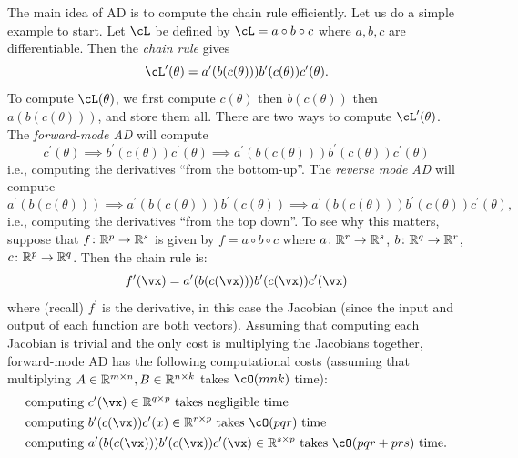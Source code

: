 \documentclass[../../book-main.tex]{subfiles}
\begin{document}
The main idea of AD is to compute the chain rule efficiently. Let us do a simple example to start. Let \(\cL\) be defined by \(\cL = a \circ b \circ c\) where \(a, b, c\) are differentiable. Then the \textit{chain rule} gives
\begin{equation}
    \cL^{\prime}(\theta) = a^{\prime}(b(c(\theta)))b^{\prime}(c(\theta))c^{\prime}(\theta).
\end{equation}
To compute \(\cL(\theta)\), we first compute \(c(\theta)\) then \(b(c(\theta))\) then \(a(b(c(\theta)))\), and store them all. There are two ways to compute \(\cL^{\prime}(\theta)\). The \textit{forward-mode AD} will compute 
\begin{equation}
    c^{\prime}(\theta) \implies b^{\prime}(c(\theta))c^{\prime}(\theta) \implies a^{\prime}(b(c(\theta)))b^{\prime}(c(\theta))c^{\prime}(\theta)
\end{equation}
i.e., computing the derivatives ``from the bottom-up''. The \textit{reverse mode AD} will compute 
\begin{equation}
    a^{\prime}(b(c(\theta))) \implies a^{\prime}(b(c(\theta)))b^{\prime}(c(\theta)) \implies a^{\prime}(b(c(\theta)))b^{\prime}(c(\theta))c^{\prime}(\theta),
\end{equation}
i.e., computing the derivatives ``from the top down''. To see why this matters, suppose that \(f \colon \mathbb{R}^{p} \to \mathbb{R}^{s}\) is given by \(f = a \circ b \circ c\) where \(a \colon \mathbb{R}^{r} \to \mathbb{R}^{s}\), \(b \colon \mathbb{R}^{q} \to \mathbb{R}^{r}\), \(c \colon \mathbb{R}^{p} \to \mathbb{R}^{q}\). Then the chain rule is:
\begin{equation}
    f^{\prime}(\vx) = a^{\prime}(b(c(\vx)))b^{\prime}(c(\vx))c^{\prime}(\vx)
\end{equation}
where (recall) \(f^{\prime}\) is the derivative, in this case the Jacobian (since the input and output of each function are both vectors). Assuming that computing each Jacobian is trivial and the only cost is multiplying the Jacobians together, forward-mode AD has the following computational costs (assuming that multiplying \(A \in \mathbb{R}^{m \times n}, B \in \mathbb{R}^{n \times k}\) takes \(\cO(mnk)\) time):
\begin{align}
    &\text{computing}\ c^{\prime}(\vx) \in \R^{q \times p}\ \text{takes negligible time} \\
    &\text{computing}\ b^{\prime}(c(\vx))c^{\prime}(x) \in \R^{r \times p}\ \text{takes \(\cO(pqr)\) time} \\
    &\text{computing}\ a^{\prime}(b(c(\vx)))b^{\prime}(c(\vx))c^{\prime}(\vx) \in \R^{s \times p}\ \text{takes \(\cO(pqr + prs)\) time.}
\end{align}
\end{document}
